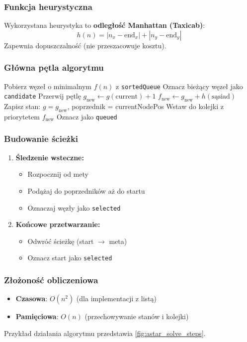 \documentclass[../../../../doc.tex]{subfiles}
\begin{document}
\subsubsection{Funkcja heurystyczna}
Wykorzystana heurystyka to \textbf{odległość Manhattan (Taxicab)}:
\[
  h(n) = |n_x - \text{end}_x| + |n_y - \text{end}_y|
\]
Zapewnia dopuszczalność (nie przeszacowuje kosztu).

\subsubsection{Główna pętla algorytmu}
\begin{algorithmic}
  \STATE Pobierz węzeł o minimalnym $f(n)$ z \texttt{sortedQueue}
  \STATE Oznacz bieżący węzeł jako \texttt{candidate}
  \STATE Przerwij pętlę
  \ENDIF
  \STATE $g_{\text{new}} \gets g(\text{current}) + 1$
  \STATE $f_{\text{new}} \gets g_{\text{new}} + h(\text{sąsiad})$
  \STATE Zapisz stan: $g = g_{\text{new}}$, poprzednik = currentNodePos
  \STATE Wstaw do kolejki z priorytetem $f_{\text{new}}$
  \STATE Oznacz jako \texttt{queued}
  \ENDIF
  \ENDFOR
  \ENDWHILE
\end{algorithmic}

\subsubsection{Budowanie ścieżki}
\begin{enumerate}
  \item \textbf{Śledzenie wsteczne:}
        \begin{itemize}
          \item Rozpocznij od mety
          \item Podążaj do poprzedników aż do startu
          \item Oznaczaj węzły jako \texttt{selected}
        \end{itemize}
  \item \textbf{Końcowe przetwarzanie:}
        \begin{itemize}
          \item Odwróć ścieżkę (start $\rightarrow$ meta)
          \item Oznacz start jako \texttt{selected}
        \end{itemize}
\end{enumerate}


\subsubsection{Złożoność obliczeniowa}
\begin{itemize}
  \item \textbf{Czasowa}: $O(n^2)$ (dla implementacji z listą)
  \item \textbf{Pamięciowa}: $O(n)$ (przechowywanie stanów i kolejki)
\end{itemize}
Przykład działania algorytmu przedstawia \cref{fig:astar_solve_steps}.


\end{document}
